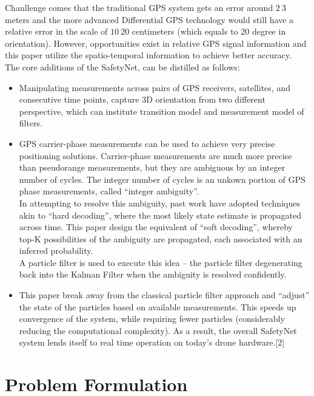 \documentclass[journal,onecolumn]{IEEEtran}
\begin{document}
Chanllenge comes that the traditional GPS system gets an error around $2~3$ meters
and the more advanced Differential GPS technology would still have a relative error
in the scale of $10~20$ centimeters (which equals to 20 degree in orientation).
However, opportunities exist in relative GPS signal information and this paper utilize
the spatio-temporal information to achieve better accuracy.\\
The core additions of the SafetyNet, can be distilled as follows:
\begin{itemize}
  \item Manipulating measurements across pairs of GPS receivers, satellites, and
  consecutive time points, capture 3D orientation from two different perspective,
  which can institute transition model and measurement model of filters.
  \item GPS carrier-phase measurements can be used to achieve very precise positioning
  solutions. Carrier-phase measurements are much more precise than pseudorange
  measurements, but they are ambiguous by an integer number of cycles. The integer number of cycles is an unkown portion of GPS phase
  measurements, called “integer ambiguity”.\\
  In attempting to resolve this ambiguity, past work have adopted techniques akin
  to “hard decoding”, where the most likely state estimate is propagated across
  time. This paper design the equivalent of “soft decoding”, whereby top-K possibilities
  of the ambiguity are propagated, each associated with an inferred probability.\\
  A particle filter is used to execute this idea – the particle filter degenerating
  back into the Kalman Filter when the ambiguity is resolved confidently.
  \item This paper break away from the classical particle filter approach and “adjust”
  the state of the particles based on available measurements. This speeds up
  convergence of the system, while requiring fewer particles (considerably
  reducing the computational complexity). As a result, the overall SafetyNet
  system lends itself to real time operation on today’s drone hardware.[2]
\end{itemize}

\section{Problem Formulation}
\end{document}
